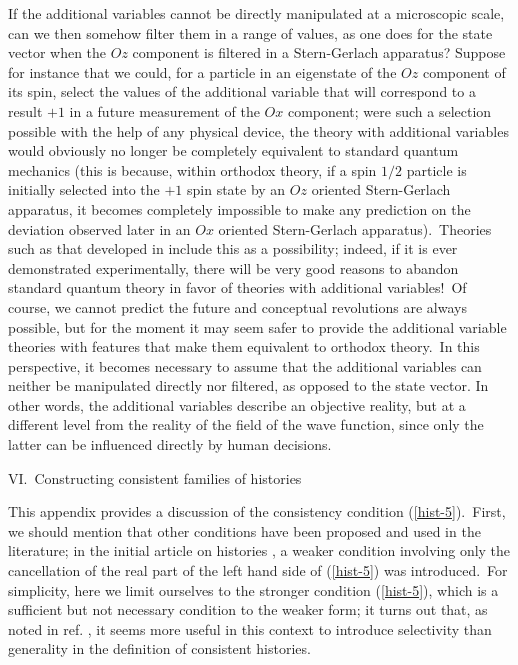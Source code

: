 \documentclass[12pt,onecolumn]{article}%
\begin{document}
If the additional variables cannot be directly manipulated at a microscopic
scale, can we then somehow filter them in a range of values, as one does for
the state vector when the $Oz$ component is filtered in a Stern-Gerlach
apparatus? Suppose for instance that we could, for a particle in an eigenstate
of the $Oz$ component of its spin, select the values of the additional
variable that will correspond to a result $+1$ in a future measurement of the
$Ox$ component; were such a selection possible with the help of any physical
device, the theory with additional variables would obviously no longer be
completely equivalent to standard quantum mechanics (this is because, within
orthodox theory, if a spin $1/2$ particle is initially selected into the $+1$
spin state by an $Oz$ oriented Stern-Gerlach apparatus, it becomes completely
impossible to make any prediction on the deviation observed later in an $Ox$
oriented Stern-Gerlach apparatus).\ Theories such as that developed in
\cite{Bohm-Bub-1} include this as a possibility; indeed, if it is ever
demonstrated experimentally, there will be very good reasons to abandon
standard quantum theory in favor of theories with additional variables!\ Of
course, we cannot predict the future and conceptual revolutions are always
possible, but for the moment it may seem safer to provide the additional
variable theories with features that make them equivalent to orthodox
theory.\ In this perspective, it becomes necessary to assume that the
additional variables can neither be manipulated directly nor filtered, as
opposed to the state vector. In other words, the additional variables describe
an objective reality, but at a different level from the reality of the field
of the wave function, since only the latter can be influenced directly by
human decisions.

\bigskip

\begin{center}
VI.\ Constructing consistent families of histories

\medskip
\end{center}

This appendix provides a discussion of the consistency condition
(\ref{hist-5}).\ First, we should mention that other conditions have been
proposed and used in the literature; in the initial article on histories
\cite{Griffiths}, a weaker condition involving only the cancellation of the
real part of the left hand side of (\ref{hist-5}) was introduced.\ For
simplicity, here we limit ourselves to the stronger condition (\ref{hist-5}),
which is a sufficient but not necessary condition to the weaker form; it turns
out that, as noted in ref. \cite{Dowker}, it seems more useful in this context
to introduce selectivity than generality in the definition of consistent histories.
\end{document}
